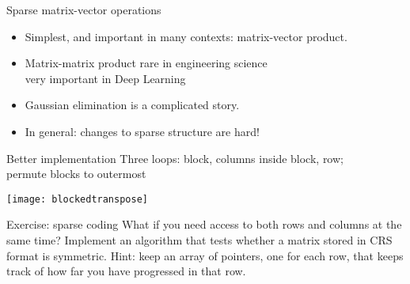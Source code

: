 

\begin{frame}{Sparse matrix-vector operations}
  \begin{itemize}
  \item Simplest, and important in many contexts: matrix-vector product.
  \item Matrix-matrix product rare in engineering science\\
    very important in Deep Learning
  \item Gaussian elimination is a complicated story.
  \item In general: changes to sparse structure are hard!
  \end{itemize}
\end{frame}


\begin{frame}{Better implementation}
  Three loops: block, columns inside block, row;\\
  permute blocks to outermost

  \texttt{[image: blockedtranspose]}
\end{frame}


\begin{frame}{Exercise: sparse coding}
  What if you need access to both rows and columns at the same time?
  Implement an algorithm that tests whether a matrix stored in CRS
  format is symmetric. Hint: keep an array of pointers, one for each
  row, that keeps track of how far you have progressed in that row.
\end{frame}

